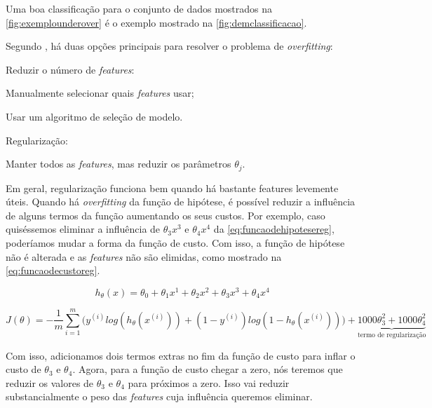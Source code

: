 Uma boa classificação para o conjunto de dados mostrados na \autoref{fig:exemplounderover} é o exemplo mostrado na \autoref{fig:demclassificacao}.

Segundo \cite{machinelearningcoursera}, há duas opções principais para resolver o problema de \textit{overfitting}:

\begin{alineas}
	\item Reduzir o número de \textit{features}:
		\begin{alineas}
			\item Manualmente selecionar quais \textit{features} usar;
			\item Usar um algoritmo de seleção de modelo.
		\end{alineas}
	\item Regularização:
		\begin{alineas}
			\item Manter todos as \textit{features}, mas reduzir os parâmetros $\theta_j$.
		\end{alineas}
\end{alineas}

Em geral, regularização funciona bem quando há bastante features levemente úteis. Quando há \textit{overfitting} da função de hipótese, é possível reduzir a influência de alguns termos da função aumentando os seus custos. Por exemplo, caso quiséssemos eliminar a influência de $\theta_3x^3$ e $\theta_4x^4$ da \autoref{eq:funcaodehipotesereg}, poderíamos mudar a forma da função de custo. Com isso, a função de hipótese não é alterada e as \textit{features} não são elimidas, como mostrado na \autoref{eq:funcaodecustoreg}.

\begin{equation} \label{eq:funcaodehipotesereg}
h_{\theta}(x) = \theta_0 + \theta_1 x^1 + \theta_2 x^2 + \theta_3 x^3 + \theta_4 x^4
\end{equation}

\begin{equation} \label{eq:funcaodecustoreg}
J(\theta) = - \frac{1}{m}\sum\limits_{i=1}^{m}\Big( y^{(i)}log(h_{\theta}(x^{(i)})) + (1-y^{(i)})log(1 - h_{\theta}(x^{(i)})) \Big)
+ \underbrace{1000 \theta_3^2 + 1000 \theta_4^2}_\text{termo de regularização}
\end{equation}

Com isso, adicionamos dois termos extras no fim da função de custo para inflar o custo de $\theta_3$ e $\theta_4$. Agora, para a função de custo chegar a zero, nós teremos que reduzir os valores de $\theta_3$ e $\theta_4$ para próximos a zero. Isso vai reduzir substancialmente o peso das \textit{features} cuja influência queremos eliminar.

